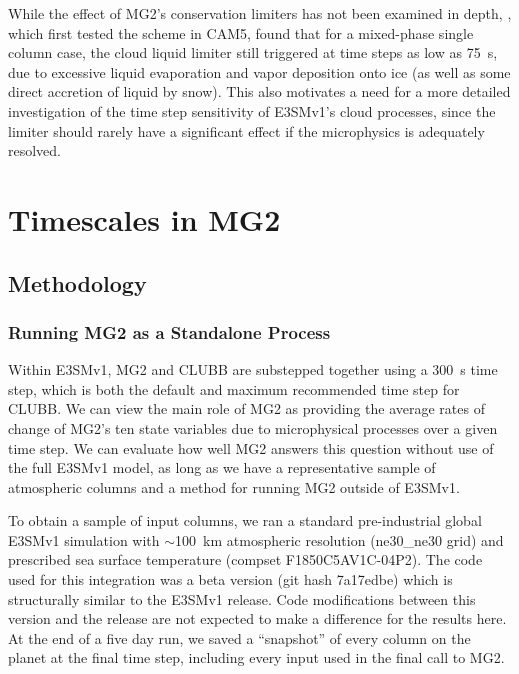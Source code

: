 \documentclass [11pt, proquest] {uwthesis}[2020/02/24]
\begin{document}
While the effect of MG2's conservation limiters has not been examined in depth, \textcite{Gettelman2015-pII}, which first tested the scheme in CAM5, found that for a mixed-phase single column case, the cloud liquid limiter still triggered at time steps as low as \SI{75}{\second}, due to excessive liquid evaporation and vapor deposition onto ice (as well as some direct accretion of liquid by snow). This also motivates a need for a more detailed investigation of the time step sensitivity of E3SMv1's cloud processes, since the limiter should rarely have a significant effect if the microphysics is adequately resolved.

\section{Timescales in MG2} \label{sec:MG2-timescales}

\subsection{Methodology}

\subsubsection{Running MG2 as a Standalone Process}
\label{sec:MG2-standalone}

Within E3SMv1, MG2 and CLUBB are substepped together using a \SI{300}{\second} time step, which is both the default and maximum recommended time step for CLUBB. We can view the main role of MG2 as providing the average rates of change of MG2's ten state variables due to microphysical processes over a given time step.  We can evaluate how well MG2 answers this question without use of the full E3SMv1 model, as long as we have a representative sample of atmospheric columns and a method for running MG2 outside of E3SMv1.

To obtain a sample of input columns, we ran a standard pre-industrial global E3SMv1 simulation with $\sim$\SI{100}{\kilo\meter} atmospheric resolution (ne30\_ne30 grid) and prescribed sea surface temperature (compset F1850C5AV1C-04P2). The code used for this integration was a beta version (git hash 7a17edbe) which is structurally similar to the E3SMv1 release. Code modifications between this version and the release are not expected to make a difference for the results here. At the end of a five day run, we saved a ``snapshot'' of every column on the planet at the final time step, including every input used in the final call to MG2.
\end{document}
